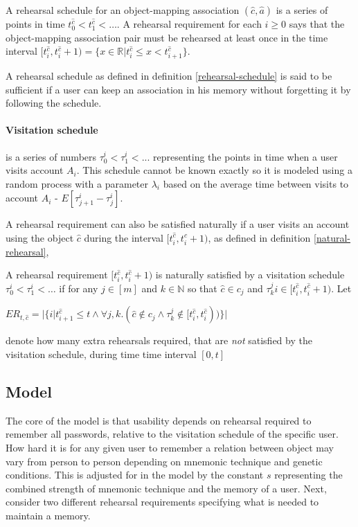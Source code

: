 \begin{definition}\label{rehearsal-schedule}
    \cite{hcp-blocki} A rehearsal schedule for an object-mapping association $(\hat c, \hat a)$ is a series of points in time $t^{\hat c}_0 < t^{\hat c}_1 < \dots$. A rehearsal requirement for each $i \ge 0$ says that the object-mapping association pair must be rehearsed at least once in the time interval $[ t^{\hat c}_i, t^{\hat c}_i+1) = \{x \in \mathbb{R} \vert t^{\hat c}_i \le x < t^{\hat c}_{i+1} \} $.
\end{definition}
A rehearsal schedule as defined in definition \ref{rehearsal-schedule} is said to be sufficient if a user can keep an association in his memory without forgetting it by following the schedule.

\paragraph{Visitation schedule \cite{hcp-blocki}} is a series of numbers $\tau^i_0 < \tau^i_1 < ...$ representing the points in time when a user visits account $A_i$. This schedule cannot be known exactly so it is modeled using a random process with a parameter $\lambda_i$ based on the average time between visits to account $A_i$ - $E[\tau^i_{j+1} - \tau^i_j]$.
\par A rehearsal requirement can also be satisfied naturally if a user visits an account using the object $\hat c$ during the interval $[ t^{\hat c}_i, t^{\hat c}_i+1)$, as defined in definition \ref{natural-rehearsal},

\begin{definition}\label{natural-rehearsal}\cite{hcp-blocki}
     A rehearsal requirement $[ t^{\hat c}_i, t^{\hat c}_i+1)$ is naturally satisfied by a visitation schedule $\tau^i_0 < \tau^i_1 <\dots$ if for any $j \in [m]$ and $k \in \mathbb{N}$ so that $\hat c \in c_j$ and $\tau^j_ki \in [ t^{\hat c}_i, t^{\hat c}_i+1)$. Let \\
    \begin{large}
    \centerline{ $ER_{t,\hat c} = \vert\{ i \vert t^{\hat c}_{i+1} \le t \wedge \forall j ,k.(\hat c \notin c_j \wedge \tau^j_k \notin [t^{\hat c}_i, t^{\hat c}_i))\} \vert$ }
    \end{large}
    denote how many extra rehearsals required, that are \emph{not} satisfied by the visitation schedule, during time time interval $[0,t]$
\end{definition}




\subsection{Model}
The core of the model is that usability depends on rehearsal required to remember all passwords, relative to the visitation schedule of the specific user. How hard it is for any given user to remember a relation between object may vary from person to person depending on mnemonic technique and genetic conditions. This is adjusted for in the model by the constant $s$ representing the combined strength of mnemonic technique and the memory of a user. Next, consider two different rehearsal requirements specifying what is needed to maintain a memory.

